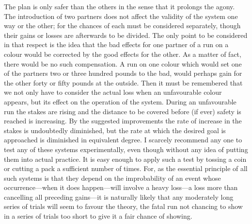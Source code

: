 \documentclass[letterpaper,12pt,oneside,openany]{memoir}
\begin{document}
The plan is only safer than the others in the sense
that it prolongs the agony. The introduction of two
partners does not affect the validity of the system one
way or the other; for the chances of each must be considered
separately, though their gains or losses are
afterwards to be divided. The only point to be considered
in that respect is the idea that the bad effects for
one partner of a run on a colour would be corrected by
the good effects for the other. As a matter of fact,
there would be no such compensation. A run on one
colour which would set one of the partners two or three
hundred pounds to the bad, would perhaps gain for
the other forty or fifty pounds at the outside. Then
it must be remembered that we not only have to consider
the actual loss when an unfavourable colour
appears, but its effect on the operation of the system.
During an unfavourable run the stakes are rising and
the distance to be covered before (if ever) safety is
reached is increasing. By the suggested improvements
the rate of increase in the stakes is undoubtedly
diminished, but the rate at which the desired goal is
approached is diminished in equivalent degree.  I
scarcely recommend any one to test any of these systems
experimentally, even though without any idea of putting
them into actual practice. It is easy enough to apply
such a test by tossing a coin or cutting a pack a
sufficient number of times. For, as the essential principle
of all such systems is that they depend on the
improbability of an event whose occurrence---when it
does happen---will involve a heavy loss---a loss more
than cancelling all preceding gains---it is naturally
likely that any moderately long series of trials will
seem to favour the theory, the fatal run not chancing
to show in a series of trials too short to give it a fair
chance of showing.
\end{document}
